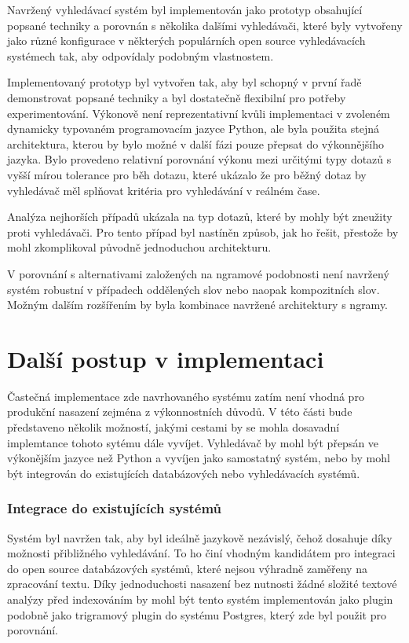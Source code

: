 \documentclass[11pt,letterpaper,oneside,openright]{book}
\begin{document}

Navržený vyhledávací systém byl implementován jako prototyp obsahující popsané
techniky a porovnán s několika dalšími vyhledávači, které byly vytvořeny jako
různé konfigurace v některých populárních open source vyhledávacích systémech
tak, aby odpovídaly podobným vlastnostem.

Implementovaný prototyp byl vytvořen tak, aby byl schopný v první řadě
demonstrovat popsané techniky a byl dostatečně flexibilní pro potřeby
experimentování. Výkonově není reprezentativní kvůli implementaci v zvoleném
dynamicky typovaném programovacím jazyce Python, ale byla použita stejná
architektura, kterou by bylo možné v další fázi pouze přepsat do výkonnějšího
jazyka. Bylo provedeno relativní porovnání výkonu mezi určitými typy dotazů s
vyšší mírou tolerance pro běh dotazu, které ukázalo že pro běžný dotaz by
vyhledávač měl splňovat kritéria pro vyhledávání v reálném čase.

Analýza nejhorších případů ukázala na typ dotazů, které by mohly být zneužity
proti vyhledávači. Pro tento případ byl nastíněn způsob, jak ho řešit, přestože
by mohl zkomplikoval původně jednoduchou architekturu.

V porovnání s alternativami založených na ngramové podobnosti není navržený
systém robustní v případech oddělených slov nebo naopak kompozitních slov.
Možným dalším rozšířením by byla kombinace navržené architektury s ngramy.

\section{Další postup v implementaci}
Častečná implementace zde navrhovaného systému zatím není vhodná pro produkční
nasazení zejména z výkonnostních důvodů. V této části bude představeno několik
možností, jakými cestami by se mohla dosavadní implemtance tohoto sytému dále
vyvíjet. Vyhledávač by mohl být přepsán ve výkonějším jazyce než Python a
vyvíjen jako samostatný systém, nebo by mohl být integrován do existujících
databázových nebo vyhledávacích systémů.

\subsubsection{Integrace do existujících systémů}
Systém byl navržen tak, aby byl ideálně jazykově nezávislý, čehož dosahuje díky
možnosti přibližného vyhledávání. To ho činí vhodným kandidátem pro integraci
do open source databázových systémů, které nejsou výhradně zaměřeny na
zpracování textu. Díky jednoduchosti nasazení bez nutnosti žádné složité
textové analýzy před indexováním by mohl být tento systém implementován
jako plugin podobně jako trigramový plugin do systému Postgres, který zde
byl použit pro porovnání.
\end{document}
